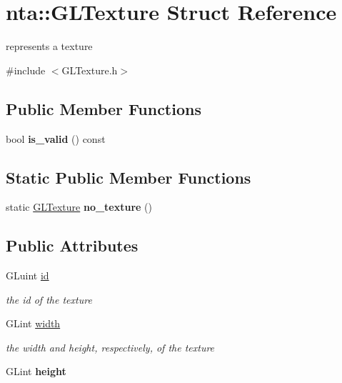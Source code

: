 \hypertarget{structnta_1_1GLTexture}{}\section{nta\+:\+:G\+L\+Texture Struct Reference}
\label{structnta_1_1GLTexture}


represents a texture  




{\ttfamily \#include $<$G\+L\+Texture.\+h$>$}

\subsection*{Public Member Functions}
\begin{DoxyCompactItemize}
\item 
\mbox{\label{structnta_1_1GLTexture_a85233cfdf7788bc8461435482caf01d9}} 
bool {\bfseries is\+\_\+valid} () const
\end{DoxyCompactItemize}
\subsection*{Static Public Member Functions}
\begin{DoxyCompactItemize}
\item 
\mbox{\label{structnta_1_1GLTexture_abc80887334f8020512952c6093e99f14}} 
static \hyperlink{structnta_1_1GLTexture}{G\+L\+Texture} {\bfseries no\+\_\+texture} ()
\end{DoxyCompactItemize}
\subsection*{Public Attributes}
\begin{DoxyCompactItemize}
\item 
\mbox{\label{structnta_1_1GLTexture_aaf0d536088f4b1062d996679b217c0f9}} 
G\+Luint \hyperlink{structnta_1_1GLTexture_aaf0d536088f4b1062d996679b217c0f9}{id}
\begin{DoxyCompactList}\small\item\em the id of the texture \end{DoxyCompactList}\item 
\mbox{\label{structnta_1_1GLTexture_a8f4d13ab2b19b700f76334c46458ac48}} 
G\+Lint \hyperlink{structnta_1_1GLTexture_a8f4d13ab2b19b700f76334c46458ac48}{width}
\begin{DoxyCompactList}\small\item\em the width and height, respectively, of the texture \end{DoxyCompactList}\item 
\mbox{\label{structnta_1_1GLTexture_a4ac2e45733ffb16238eb696d663e62a1}} 
G\+Lint {\bfseries height}
\end{DoxyCompactItemize}


